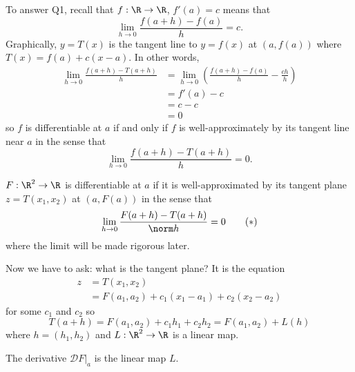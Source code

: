 \documentclass[a4paper]{article}
\newcommand*{\D}{\mathcal{D}}
\theoremstyle{definition}
\begin{document}
To answer Q1, recall that \(f: \R \to \R\), \(f'(a) = c\) means that
\[
  \lim_{h \to 0} \frac{f(a+h) - f(a)}{h} = c.
\]
Graphically, \(y = T(x)\) is the tangent line to \(y = f(x)\) at \((a, f(a))\) where \(T(x) = f(a) + c(x - a)\). In other words,
\begin{align*}
  \lim_{h \to 0} \frac{f(a + h) - T(a + h)}{h} &= \lim_{h \to 0} \left( \frac{f(a + h) - f(a)}{h} - \frac{ch}{h} \right) \\
                                               &= f'(a) -c \\
                                               &= c - c \\
                                               &= 0
\end{align*}
so \(f\) is differentiable at \(a\) if and only if \(f\) is well-approximately by its tangent line near \(a\) in the sense that
\[
  \lim_{h \to 0} \frac{f(a + h) - T(a + h)}{h} = 0.
\]

\begin{answer}[Answer to Q1]
  \(F: \R^2 \to \R\) is differentiable at \(a\) if it is well-approximated by its tangent plane \(z = T(x_1, x_2)\) at \((a, F(a))\) in the sense that
  \begin{equation*}
    \label{eqn:derivative}
    \lim_{h \to 0} \frac{F(a + h) - T(a + h)}{\norm h} = 0
    \tag{\(\ast\)}
  \end{equation*}
  where the limit will be made rigorous later.
\end{answer}

Now we have to ask: what is the tangent plane? It is the equation
\begin{align*}
  z &= T(x_1, x_2) \\
    &= F(a_1, a_2) +c_1(x_1 - a_1) + c_2(x_2 - a_2)
\end{align*}
for some \(c_1\) and \(c_2\) so
\[
  T(a + h) = F(a_1, a_2) + c_1h_1 + c_2h_2 = F(a_1, a_2) + L(h)
\]
where \(h = (h_1, h_2)\) and \(L: \R^2 \to \R\) is a linear map.

\begin{answer}[Answer to Q2]
  The derivative \(\D F|_a\) is the linear map \(L\).
\end{answer}
\end{document}

